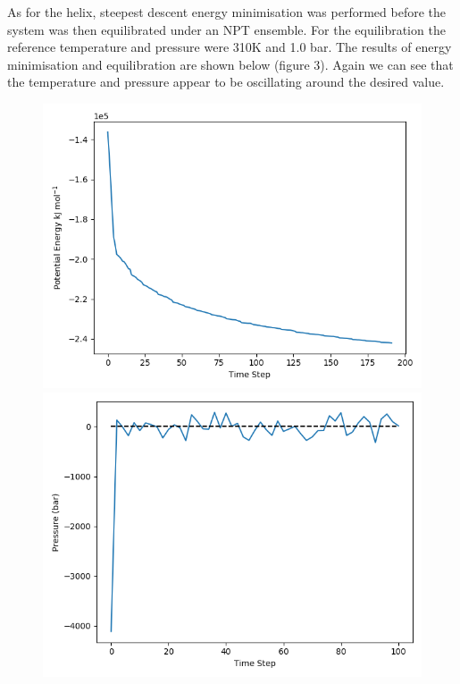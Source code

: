 \documentclass[12pt, onecolumn]{revtex4}    %
\begin{document}
As for the helix, steepest descent energy minimisation was performed before the system was then equilibrated under an NPT ensemble\cite{GMX}.  For the equilibration the reference temperature and pressure were 310K and 1.0 bar.  The results of energy minimisation and equilibration are shown below (figure 3).  Again we can see that the temperature and pressure appear to be oscillating around the desired value.  

\begin{figure}[h!]
\includegraphics[scale=0.4]{HairE}
\includegraphics[scale=0.4]{HairNPTP}

\end{figure}
\end{document}
